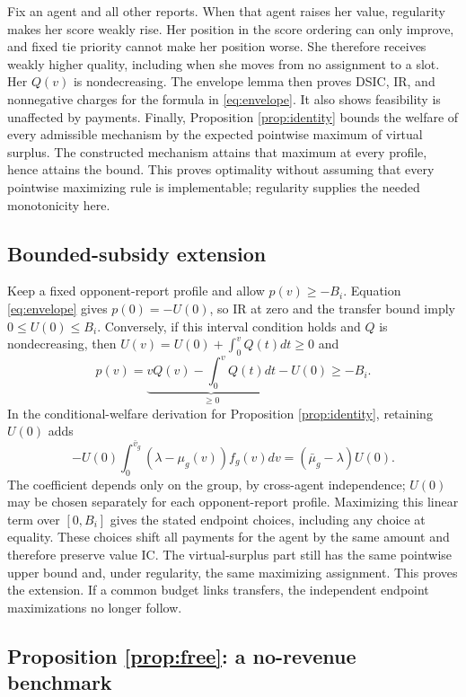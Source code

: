 \documentclass[11pt]{article}
\begin{document}
Fix an agent and all other reports. When that agent raises her value, regularity makes her score weakly rise. Her position in the score ordering can only improve, and fixed tie priority cannot make her position worse. She therefore receives weakly higher quality, including when she moves from no assignment to a slot. Her $Q(v)$ is nondecreasing. The envelope lemma then proves DSIC, IR, and nonnegative charges for the formula in \eqref{eq:envelope}. It also shows feasibility is unaffected by payments. Finally, Proposition \ref{prop:identity} bounds the welfare of every admissible mechanism by the expected pointwise maximum of virtual surplus. The constructed mechanism attains that maximum at every profile, hence attains the bound. This proves optimality without assuming that every pointwise maximizing rule is implementable; regularity supplies the needed monotonicity here.

\subsection{Bounded-subsidy extension}\label{app:subsidy}

Keep a fixed opponent-report profile and allow $p(v)\ge-B_i$. Equation \eqref{eq:envelope} gives $p(0)=-U(0)$, so IR at zero and the transfer bound imply $0\le U(0)\le B_i$. Conversely, if this interval condition holds and $Q$ is nondecreasing, then $U(v)=U(0)+\int_0^vQ(t)dt\ge0$ and
\[
p(v)=\underbrace{vQ(v)-\int_0^vQ(t)dt}_{\ge0}-U(0)\ge-B_i.
\]
In the conditional-welfare derivation for Proposition \ref{prop:identity}, retaining $U(0)$ adds
\[
-U(0)\int_0^{\bar v_g}(\lambda-\mu_g(v))f_g(v)dv
=(\bar\mu_g-\lambda)U(0).
\]
The coefficient depends only on the group, by cross-agent independence; $U(0)$ may be chosen separately for each opponent-report profile. Maximizing this linear term over $[0,B_i]$ gives the stated endpoint choices, including any choice at equality. These choices shift all payments for the agent by the same amount and therefore preserve value IC. The virtual-surplus part still has the same pointwise upper bound and, under regularity, the same maximizing assignment. This proves the extension. If a common budget links transfers, the independent endpoint maximizations no longer follow.

\subsection{Proposition \ref{prop:free}: a no-revenue benchmark}
\end{document}
